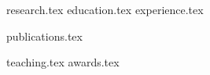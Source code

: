 \documentclass[letterpaper,11pt]{article}
\begin{document}


{research.tex}
{education.tex}
{experience.tex}

{publications.tex}

{teaching.tex}
{awards.tex}
\end{document}
